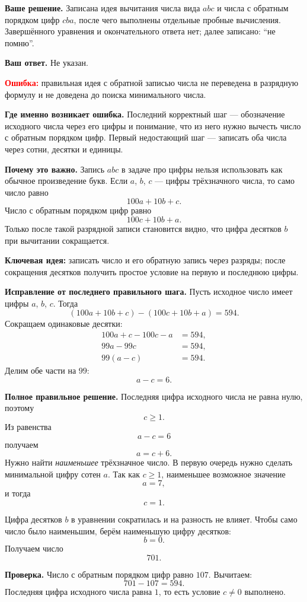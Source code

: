 \documentclass[12pt,a4paper]{article}
\begin{document}
\textbf{Ваше решение.}
Записана идея вычитания числа вида $abc$ и числа с обратным порядком цифр $cba$, после чего выполнены отдельные пробные вычисления. Завершённого уравнения и окончательного ответа нет; далее записано: ``не помню''.

\textbf{Ваш ответ.}
Не указан.

\textcolor{red}{\textbf{Ошибка:}} правильная идея с обратной записью числа не переведена в разрядную формулу и не доведена до поиска минимального числа.

\textbf{Где именно возникает ошибка.}
Последний корректный шаг --- обозначение исходного числа через его цифры и понимание, что из него нужно вычесть число с обратным порядком цифр. Первый недостающий шаг --- записать оба числа через сотни, десятки и единицы.

\textbf{Почему это важно.}
Запись $abc$ в задаче про цифры нельзя использовать как обычное произведение букв. Если $a$, $b$, $c$ --- цифры трёхзначного числа, то само число равно
\[
100a+10b+c.
\]
Число с обратным порядком цифр равно
\[
100c+10b+a.
\]
Только после такой разрядной записи становится видно, что цифра десятков $b$ при вычитании сокращается.

\textcolor{blue!60!black}{\textbf{Ключевая идея:}}
записать число и его обратную запись через разряды; после сокращения десятков получить простое условие на первую и последнюю цифры.

\textbf{Исправление от последнего правильного шага.}
Пусть исходное число имеет цифры $a$, $b$, $c$. Тогда
\[
(100a+10b+c)-(100c+10b+a)=594.
\]
Сокращаем одинаковые десятки:
\begin{align*}
100a+c-100c-a&=594,\\
99a-99c&=594,\\
99(a-c)&=594.
\end{align*}
Делим обе части на $99$:
\[
a-c=6.
\]

\textbf{Полное правильное решение.}
Последняя цифра исходного числа не равна нулю, поэтому
\[
c\geq1.
\]
Из равенства
\[
a-c=6
\]
получаем
\[
a=c+6.
\]
Нужно найти \emph{наименьшее} трёхзначное число. В первую очередь нужно сделать минимальной цифру сотен $a$. Так как $c\geq1$, наименьшее возможное значение
\[
a=7,
\]
и тогда
\[
c=1.
\]

Цифра десятков $b$ в уравнении сократилась и на разность не влияет. Чтобы само число было наименьшим, берём наименьшую цифру десятков:
\[
b=0.
\]
Получаем число
\[
\boxed{701}.
\]

\textbf{Проверка.}
Число с обратным порядком цифр равно $107$. Вычитаем:
\[
701-107=594.
\]
Последняя цифра исходного числа равна $1$, то есть условие $c\ne0$ выполнено.
\end{document}
